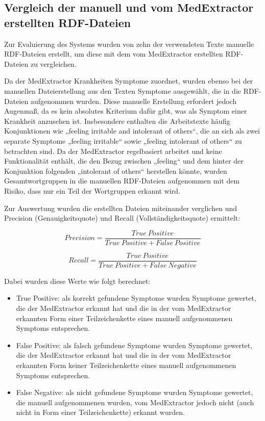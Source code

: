 

\subsection{Vergleich der manuell und vom MedExtractor erstellten RDF-Dateien}
\label{subsec:RDF-Vergleich} 

Zur Evaluierung des Systems wurden von zehn der verwendeten Texte manuelle RDF-Dateien erstellt, um diese mit dem vom MedExtractor erstellten RDF-Dateien zu vergleichen. 

Da der MedExtractor Krankheiten Symptome zuordnet, wurden ebenso bei der manuellen Dateierstellung aus den Texten Symptome ausgewählt, die in die RDF-Dateien aufgenommen wurden. Diese manuelle Erstellung erfordert jedoch Augenmaß, da es kein absolutes Kriterium dafür gibt, was als Symptom einer Krankheit anzusehen ist. Insbesondere enthalten die Arbeitstexte häufig Konjunktionen wie „feeling irritable and intolerant of others“, die an sich als zwei separate Symptome „feeling irritable“ sowie „feeling intolerant of others“ zu betrachten sind. Da der MedExtractor regelbasiert arbeitet und keine Funktionalität enthält, die den Bezug zwischen „feeling“ und dem hinter der Konjunktion folgenden „intolerant of others“ herstellen könnte, wurden Gesamtwortgruppen in die manuellen RDF-Dateien aufgenommen mit dem Risiko, dass nur ein Teil der Wortgruppen erkannt wird.

Zur Auswertung wurden die erstellten Dateien miteinander verglichen und Precision (Genauigkeitsquote) und Recall (Vollständigkeitsquote) ermittelt:

\[ Precision = \frac{True\ Positive}{True\ Positive + False\ Positive} \]

\[ Recall = \frac{True\ Positive}{True\ Positive + False\ Negative} \]

Dabei wurden diese Werte wie folgt berechnet:
\begin{itemize}
\item True Positive: als korrekt gefundene Symptome wurden Symptome gewertet, die der MedExtractor erkannt hat und die in der vom MedExtractor erkannten Form einer Teilzeichenkette eines manuell aufgenommenen Symptoms entsprechen. 
\item False Positive: als falsch gefundene Symptome wurden Symptome gewertet, die der MedExtractor erkannt hat und die in der vom MedExtractor erkannten Form keiner Teilzeichenkette eines manuell aufgenommenen Symptoms entsprechen.
\item False Negative: als nicht gefundene Symptome wurden Symptome gewertet, die manuell aufgenommenen wurden, vom MedExtractor jedoch nicht (auch nicht in Form einer Teilzeichenkette) erkannt wurden.
\end{itemize}


